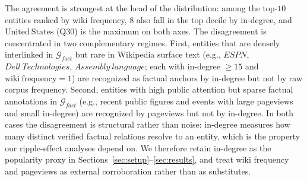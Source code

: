 The agreement is strongest at the head of the distribution: among the top-$10$ entities ranked by wiki frequency, $8$ also fall in the top decile by in-degree, and $\mathrm{United\ States}$ (Q30) is the maximum on both axes. The disagreement is concentrated in two complementary regimes. First, entities that are densely interlinked in $\mathcal{G}_{fact}$ but rare in Wikipedia surface text (e.g., $\mathit{ESPN}$, $\mathit{Dell\ Technologies}$, $\mathit{Assembly\ language}$; each with in-degree $\ge 15$ and $\mathrm{wiki\ frequency} = 1$) are recognized as factual anchors by in-degree but not by raw corpus frequency. Second, entities with high public attention but sparse factual annotations in $\mathcal{G}_{fact}$ (e.g., recent public figures and events with large pageviews and small in-degree) are recognized by pageviews but not by in-degree. In both cases the disagreement is structural rather than noise: in-degree measures how many distinct verified factual relations resolve to an entity, which is the property our ripple-effect analyses depend on. We therefore retain in-degree as the popularity proxy in Sections~\ref{sec:setup}--\ref{sec:results}, and treat wiki frequency and pageviews as external corroboration rather than as substitutes.


